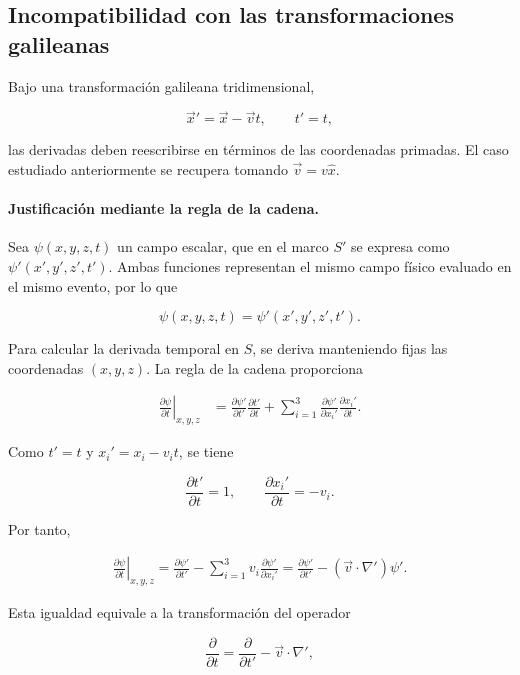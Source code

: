 \subsection{Incompatibilidad con las transformaciones galileanas}

Bajo una transformación galileana tridimensional,

\[
    \vec{x}'=\vec{x}-\vec{v}t,
    \qquad
    t'=t,
\]

las derivadas deben reescribirse en términos de las coordenadas primadas. El caso estudiado anteriormente se recupera tomando $\vec{v}=v\hat{x}$.

\paragraph{Justificación mediante la regla de la cadena.}
Sea $\psi(x,y,z,t)$ un campo escalar, que en el marco $S'$ se expresa como $\psi'(x',y',z',t')$. Ambas funciones representan el mismo campo físico evaluado en el mismo evento, por lo que

\[
    \psi(x,y,z,t)=\psi'(x',y',z',t').
\]

Para calcular la derivada temporal en $S$, se deriva manteniendo fijas las coordenadas $(x,y,z)$. La regla de la cadena proporciona

\begin{align*}
    \left.\frac{\partial \psi}{\partial t}\right|_{x,y,z}
    &={}
    \frac{\partial \psi'}{\partial t'}\frac{\partial t'}{\partial t}
    +\sum_{i=1}^{3}
        \frac{\partial \psi'}{\partial x_i'}
        \frac{\partial x_i'}{\partial t}.
\end{align*}

Como $t'=t$ y $x_i'=x_i-v_i t$, se tiene

\[
    \frac{\partial t'}{\partial t}=1,
    \qquad
    \frac{\partial x_i'}{\partial t}=-v_i.
\]

Por tanto,

\begin{align*}
    \left.\frac{\partial \psi}{\partial t}\right|_{x,y,z}
    =\frac{\partial \psi'}{\partial t'}
    -\sum_{i=1}^{3}v_i\frac{\partial \psi'}{\partial x_i'}
    =\frac{\partial \psi'}{\partial t'}
    -(\vec{v}\cdot\nabla')\psi'.
\end{align*}

Esta igualdad equivale a la transformación del operador

\[
    \frac{\partial}{\partial t}
    =\frac{\partial}{\partial t'}
    -\vec{v}\cdot\nabla',
\]

